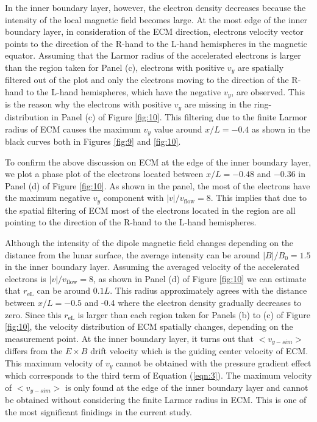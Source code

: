 \documentclass[draft,jgrga]{agutex2015}
\begin{document}
\begin{article}
In the inner boundary layer, however, 
the electron density decreases because the intensity of the
local magnetic field becomes large.
At the most edge of the inner boundary layer,
in consideration of the ECM direction,
electrons velocity vector points to the direction
of the R-hand to the L-hand hemispheres in the magnetic equator.
Assuming that the Larmor radius of the accelerated electrons
is larger than the region taken for Panel (c), 
electrons with positive $v_y$ are spatially filtered out of the plot
and only the electrons moving to the direction
of the R-hand to the L-hand hemispheres, 
which have the negative $v_y$, are observed. 
This is the reason why the electrons with positive $v_y$ 
are missing in the ring-distribution in Panel (c) of Figure \ref{fig:10}.
This filtering due to the finite Larmor radius of ECM 
causes the maximum $v_y$ value around $x/L = -0.4$ as
shown in the black curves both in Figures \ref{fig:9} and \ref{fig:10}. 

To confirm the above discussion on ECM 
at the edge of the inner boundary layer,
we plot a phase plot of the electrons located between 
$x/L = -0.48$ and $-0.36$ in Panel (d) of Figure \ref{fig:10}.
As shown in the panel, 
the most of the electrons have the maximum negative $v_y$ component 
with $|v|/v_\mathrm{flow}=8$. 
This implies that due to the spatial filtering of ECM 
most of the electrons located in the region 
are all pointing to the direction
of the R-hand to the L-hand hemispheres. 

Although the intensity of the dipole magnetic field changes depending on 
the distance from the lunar surface, 
the average intensity can be around $|B|/B_{\mathrm{0}}=1.5$ in the inner boundary layer.
Assuming the averaged velocity of the accelerated electrons is 
$|v|/v_\mathrm{flow}=8$, as shown in Panel (d) of Figure \ref{fig:10} 
we can estimate that $r_\mathrm{eL}$ can be around $0.1L$.
This radius approximately agrees with the distance 
between $x/L = -0.5$ and -0.4 where
the electron density gradually decreases to zero.
Since this $r_\mathrm{eL}$ is larger than each region 
taken for Panels (b) to (c) of Figure \ref{fig:10}, 
the velocity distribution of ECM spatially changes,
depending on the measurement point.
At the inner boundary layer,
it turns out that $<v_{y-sim}>$ differs from the $E \times B$ drift velocity
which is the guiding center velocity of ECM.
This maximum velocity of $v_y$ cannot be obtained with 
the pressure gradient effect which corresponds
to the third term of Equation (\ref{eqn:3}). 
The maximum velocity of $<v_{y-sim}>$ is only found at the edge of the
inner boundary layer and cannot be obtained without considering
the finite Larmor radius in ECM. 
This is one of the most significant finidings in the current study.


\end{article}
\end{document}
